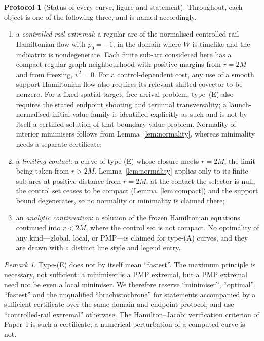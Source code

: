 \documentclass[12pt]{iopart}
\theoremstyle{plain}
\theoremstyle{definition}
\newtheorem{protocol}{Protocol}
\theoremstyle{remark}
\newtheorem{remark}[proposition]{Remark}
\begin{document}
\begin{protocol}[Status of every curve, figure and statement]
\label{prot:status}
Throughout, each object is one of the following three, and is named accordingly.
\begin{enumerate}
\item[\rm(E)] a \emph{controlled-rail extremal}: a regular arc of the
normalised controlled-rail Hamiltonian flow with $p_0=-1$, in the
domain where $W$ is timelike and the indicatrix is nondegenerate.
Each finite sub-arc considered here has a compact regular graph
neighbourhood with positive margins from $r=2M$ and from freezing,
$\bar v^2=0$. For a control-dependent cost, any use of a smooth support
Hamiltonian flow also requires its relevant shifted covector to be
nonzero. For a fixed-spatial-target, free-arrival problem, type~(E)
also requires the stated endpoint shooting and terminal transversality;
a launch-normalised initial-value family is identified explicitly as
such and is not by itself a certified solution of that boundary-value
problem. Normality of interior minimisers follows from
Lemma~\ref{lem:normality}, whereas minimality needs a separate certificate;
\item[\rm(C)] a \emph{limiting contact}: a curve of type (E) whose closure meets
$r=2M$, the limit being taken from $r>2M$. Lemma~\ref{lem:normality} applies only to
its finite sub-arcs at positive distance from $r=2M$; at the contact the selector is
null, the control set ceases to be compact (Lemma~\ref{lem:compact}) and the support
bound degenerates, so no normality or minimality is claimed there;
\item[\rm(A)] an \emph{analytic continuation}: a solution of the frozen
Hamiltonian equations continued into $r<2M$, where the control set is not
compact. No optimality of any kind---global, local, or PMP---is claimed for
type-(A) curves, and they are drawn with a distinct line style and legend entry.
\end{enumerate}
\end{protocol}

\begin{remark}
Type-(E) does not by itself mean ``fastest''. The maximum principle is necessary,
not sufficient: a minimiser is a PMP extremal, but a PMP extremal need not be
even a local minimiser. We therefore reserve ``minimiser'', ``optimal'',
``fastest'' and the unqualified ``brachistochrone'' for statements accompanied by
a sufficient certificate over the same domain and endpoint protocol, and use
``controlled-rail extremal'' otherwise. The Hamilton--Jacobi verification
criterion of Paper~I is such a certificate; a numerical perturbation of a
computed curve is not.
\end{remark}
\end{document}
